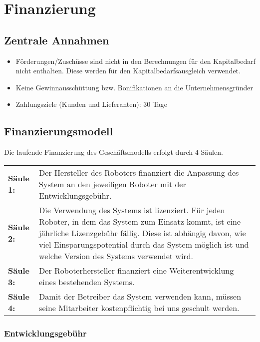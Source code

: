 \chapter{Finanzierung}
\section{Zentrale Annahmen}
\begin{itemize}
	\item Förderungen/Zuschüsse sind nicht in den Berechnungen für den Kapitalbedarf nicht enthalten. Diese werden \ggf für den Kapitalbedarfsausgleich verwendet.
	\item Keine Gewinnausschüttung bzw. Bonifikationen an die Unternehmensgründer
	\item Zahlungsziele (Kunden und Lieferanten): 30 Tage
\end{itemize}

\section{Finanzierungsmodell}
Die laufende Finanzierung des Geschäftsmodells erfolgt durch 4 Säulen. 

\noindent
\begin{tabular}{@{}>{\raggedright\arraybackslash}p{1.8cm}@{}>{\raggedright\arraybackslash}p{\textwidth - 1.8cm}}
 
	\textbf{Säule 1:} & Der Hersteller des Roboters finanziert die Anpassung des System an den jeweiligen Roboter mit der Entwicklungsgebühr. \\ 

	\textbf{Säule 2:} & Die Verwendung des Systems ist lizenziert. Für jeden Roboter, in dem das System zum Einsatz kommt, ist eine jährliche Lizenzgebühr fällig. Diese ist abhängig davon, wie viel Einsparungspotential durch das System möglich ist und welche Version des Systems verwendet wird. \\
	
	\textbf{Säule 3:} & Der Roboterhersteller finanziert eine Weiterentwicklung eines bestehenden Systems. \\
	
	\textbf{Säule 4:} & Damit der Betreiber das System verwenden kann, müssen seine Mitarbeiter kostenpflichtig bei uns geschult werden.
\end{tabular}

\subsection{Entwicklungsgebühr}
